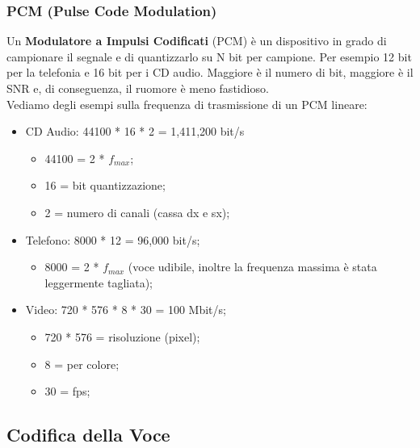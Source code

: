\documentclass{article}
\begin{document}
			\subsubsection{PCM (Pulse Code Modulation)}
				Un \textbf{Modulatore a Impulsi Codificati} (PCM) è un dispositivo in grado di campionare il segnale e di quantizzarlo su N bit per campione. Per esempio 12 bit per la telefonia e 16 bit per i CD audio. Maggiore è il numero di bit, maggiore è il SNR e, di conseguenza, il ruomore è meno fastidioso.
				\\Vediamo degli esempi sulla frequenza di trasmissione di un PCM lineare:
				\begin{itemize}
					\item CD Audio: 44100 * 16 * 2 = 1,411,200 bit/s
					\begin{itemize}
						\item 44100 = 2 * $f_{max}$;
						\item 16 = bit quantizzazione;
						\item 2 = numero di canali (cassa dx e sx);
					\end{itemize}
					\item Telefono: 8000 * 12 = 96,000 bit/s;
					\begin{itemize}
						\item 8000 = 2 * $f_{max}$ (voce udibile, inoltre la frequenza massima è stata leggermente tagliata);
					\end{itemize}
					\item Video: 720 * 576 * 8 * 30 = 100 Mbit/s;
					\begin{itemize}
						\item 720 * 576 = risoluzione (pixel);
						\item 8 = per colore;
						\item 30 = fps;
					\end{itemize}
				\end{itemize}
				
		\subsection{Codifica della Voce}
			
\end{document}
